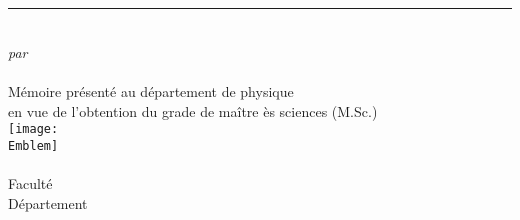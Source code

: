 \documentclass[main.tex]{subfiles}
\begin{document}
\newcommand{\CustomRule}{\rule{13cm}{0.75pt} \\}

\begin{titlepage}

    \centering
    \vspace{5.0cm}
    {
        \textsc{\LARGE\MakeLowercase{\Titre}} \\[0.5cm]
        \textsc{\Large\MakeLowercase{\SousTitre}} \\[1.5cm]
    }
    \vspace{0.5cm}
    \CustomRule
    \vspace{0.3cm}
    \vspace{2.0cm}
    {
        \emph{\large par} \\[0.25cm]
        {\large\Nom} \\[2.5cm]
    }
    \vspace{1.5cm}
    {{Mémoire présenté au département de physique}\\[0.25cm]
    {en vue de l’obtention du grade de maître ès sciences (M.Sc.)}\\[2cm]}
    \vspace{1.5cm}
    \texttt{[image: \\Emblem]} \\
    {
        \large \University \\
        \large Faculté \Faculte \\
        \large Département \Departement \\
        \large \Date
    }

\end{titlepage}
\end{document}
